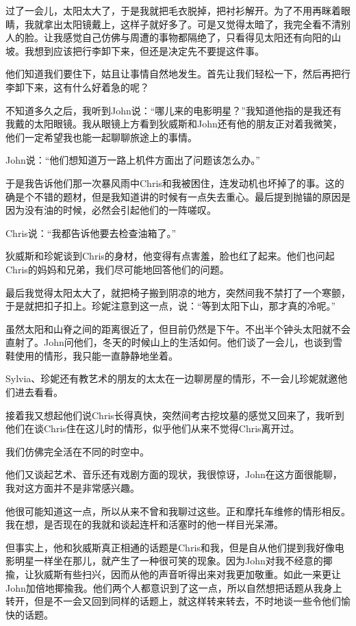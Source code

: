 \documentclass[UTF8]{article}
\begin{document}
\par 过了一会儿，太阳太大了，于是我就把毛衣脱掉，把衬衫解开。为了不用再眯着眼睛，我就拿出太阳镜戴上，这样子就好多了。可是又觉得太暗了，我完全看不清别人的脸。让我感觉自己仿佛与周遭的事物都隔绝了，只看得见太阳还有向阳的山坡。我想到应该把行李卸下来，但还是决定先不要提这件事。
\par 他们知道我们要住下，姑且让事情自然地发生。首先让我们轻松一下，然后再把行李卸下来，这有什么好着急的呢？
\par 不知道多久之后，我听到John说：“哪儿来的电影明星？”我知道他指的是我还有我戴的太阳眼镜。我从眼镜上方看到狄威斯和John还有他的朋友正对着我微笑，他们一定希望我也能一起聊聊旅途上的事情。
\par John说：“他们想知道万一路上机件方面出了问题该怎么办。”
\par 于是我告诉他们那一次暴风雨中Chris和我被困住，连发动机也坏掉了的事。这的确是个不错的题材，但是我知道讲的时候有一点失去重心。最后提到抛锚的原因是因为没有油的时候，必然会引起他们的一阵嗟叹。
\par Chris说：“我都告诉他要去检查油箱了。”
\par 狄威斯和珍妮谈到Chris的身材，他变得有点害羞，脸也红了起来。他们也问起Chris的妈妈和兄弟，我们尽可能地回答他们的问题。
\par 最后我觉得太阳太大了，就把椅子搬到阴凉的地方，突然间我不禁打了一个寒颤，于是就把扣子扣上。珍妮注意到这一点，说：“等到太阳下山，那才真的冷呢。”
\par 虽然太阳和山脊之间的距离很近了，但目前仍然是下午。不出半个钟头太阳就不会直射了。John问他们，冬天的时候山上的生活如何。他们谈了一会儿，也谈到雪鞋使用的情形，我只能一直静静地坐着。
\par Sylvia、珍妮还有教艺术的朋友的太太在一边聊房屋的情形，不一会儿珍妮就邀他们进去看看。
\par 接着我又想起他们说Chris长得真快，突然间考古挖坟墓的感觉又回来了，我听到他们在谈Chris住在这儿时的情形，似乎他们从来不觉得Chris离开过。
\par 我们仿佛完全活在不同的时空中。
\par 他们又谈起艺术、音乐还有戏剧方面的现状，我很惊讶，John在这方面很能聊，我对这方面并不是非常感兴趣。
\par 他很可能知道这一点，所以从来不曾和我聊过这些。正和摩托车维修的情形相反。我在想，是否现在的我就和谈起连杆和活塞时的他一样目光呆滞。
\par 但事实上，他和狄威斯真正相通的话题是Chris和我，但是自从他们提到我好像电影明星一样坐在那儿，就产生了一种很可笑的现象。因为John对我不经意的揶揄，让狄威斯有些扫兴，因而从他的声音听得出来对我更加敬重。如此一来更让John加倍地揶揄我。他们两个人都意识到了这一点，所以自然想把话题从我身上转开，但是不一会又回到同样的话题上，就这样转来转去，不时地谈一些令他们愉快的话题。
\end{document}
